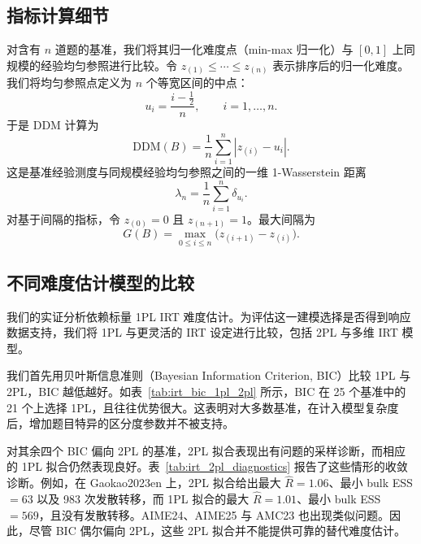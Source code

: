 \subsection{指标计算细节}

对含有 $n$ 道题的基准，我们将其归一化难度点（min-max 归一化）与 $[0,1]$ 上同规模的经验均匀参照进行比较。令
$z_{(1)}\le \cdots \le z_{(n)}$ 表示排序后的归一化难度。我们将均匀参照点定义为 $n$ 个等宽区间的中点：
\[
u_i=\frac{i-\frac{1}{2}}{n}, \qquad i=1,\ldots,n.
\]
于是 $\mathrm{DDM}$ 计算为
\[
\mathrm{DDM}(B)
=
\frac{1}{n}\sum_{i=1}^n |z_{(i)}-u_i|.
\]
这是基准经验测度与同规模经验均匀参照之间的一维 1-Wasserstein 距离
\[
\lambda_n=\frac{1}{n}\sum_{i=1}^n \delta_{u_i}.
\]
对基于间隔的指标，令
$z_{(0)}=0$ 且 $z_{(n+1)}=1$。最大间隔为
\[
G(B)=\max_{0\le i\le n}\bigl(z_{(i+1)}-z_{(i)}\bigr).
\]

\subsection{不同难度估计模型的比较}
\label{app:irt_model_comparison}

我们的实证分析依赖标量 1PL IRT 难度估计。为评估这一建模选择是否得到响应数据支持，我们将 1PL 与更灵活的 IRT 设定进行比较，包括 2PL 与多维 IRT 模型。

我们首先用贝叶斯信息准则（Bayesian Information Criterion, BIC）比较 1PL 与 2PL，BIC 越低越好。如表~\ref{tab:irt_bic_1pl_2pl} 所示，BIC 在 25 个基准中的 21 个上选择 1PL，且往往优势很大。这表明对大多数基准，在计入模型复杂度后，增加题目特异的区分度参数并不被支持。

对其余四个 BIC 偏向 2PL 的基准，2PL 拟合表现出有问题的采样诊断，而相应的 1PL 拟合仍然表现良好。表~\ref{tab:irt_2pl_diagnostics} 报告了这些情形的收敛诊断。例如，在 Gaokao2023en 上，2PL 拟合给出最大 $\hat{R}=1.06$、最小 bulk ESS $=63$ 以及 983 次发散转移，而 1PL 拟合的最大 $\hat{R}=1.01$、最小 bulk ESS $=569$，且没有发散转移。AIME24、AIME25 与 AMC23 也出现类似问题。因此，尽管 BIC 偶尔偏向 2PL，这些 2PL 拟合并不能提供可靠的替代难度估计。

